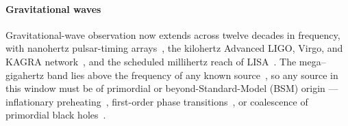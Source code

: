 \paragraph*{Gravitational waves}
Gravitational-wave observation now extends across twelve
decades in frequency, with nanohertz pulsar-timing
arrays~\cite{nanograv2023fifteen, EPTA:2023fyk, Reardon:2023gzh},
the kilohertz Advanced LIGO, Virgo, and KAGRA
network~\cite{LIGOScientific:2014pky, VIRGO:2014yos, KAGRA:2020tym},
and the scheduled millihertz reach of LISA~\cite{amaro2017lisa, LISA:2024hlh}.
The mega--gigahertz band lies above the frequency
of any known source~\cite{Aggarwal:2020olq, Aggarwal:2025noe},
so any source in this window must be of primordial or
beyond-Standard-Model (BSM) origin --- \eg inflationary
preheating~\cite{Easther:2006gt}, first-order phase
transitions~\cite{Grojean:2006bp}, or coalescence of
primordial black holes~\cite{Dolgov:2012be}.
